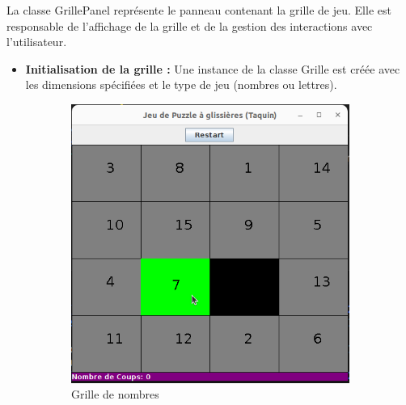 \documentclass[a4paper,10pt]{article}
\begin{document}
La classe GrillePanel représente le panneau contenant la grille de jeu. Elle est responsable de l'affichage de la grille et de la gestion des interactions avec l'utilisateur.

\begin{itemize}
\item \textbf{Initialisation de la grille :} Une instance de la classe Grille est créée avec les dimensions spécifiées et le type de jeu (nombres ou lettres).
\end{itemize}



\begin{figure}[H]
\centering
\begin{subfigure}{0.45\textwidth}
  \centering
  \includegraphics[width=\linewidth]{captures/colorer.png}
  \caption{Grille de nombres}
\end{subfigure}
\hfill
\begin{subfigure}{0.45\textwidth}
  \centering

\end{subfigure}
\end{figure}
\end{document}
